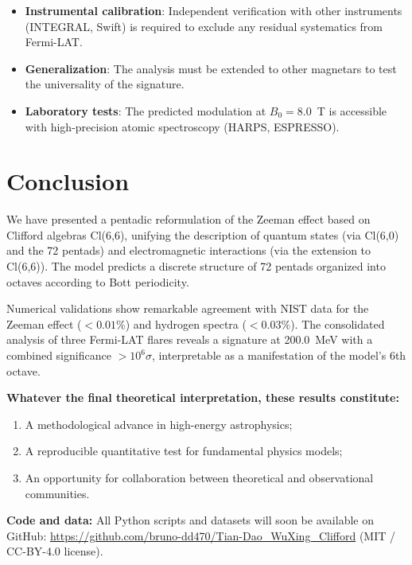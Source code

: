 \documentclass[11pt,a4paper]{article}
\theoremstyle{plain}
\theoremstyle{definition}
\theoremstyle{remark}
\begin{document}
\begin{itemize}
  \item \textbf{Instrumental calibration}: Independent verification with other instruments (INTEGRAL, Swift) is required to exclude any residual systematics from Fermi-LAT.
  \item \textbf{Generalization}: The analysis must be extended to other magnetars to test the universality of the signature.
  \item \textbf{Laboratory tests}: The predicted modulation at $B_0 = 8.0$~T is accessible with high-precision atomic spectroscopy (HARPS, ESPRESSO).
\end{itemize}

\section{Conclusion}

We have presented a pentadic reformulation of the Zeeman effect based on Clifford algebras Cl(6,6), unifying the description of quantum states (via Cl(6,0) and the 72 pentads) and electromagnetic interactions (via the extension to Cl(6,6)). The model predicts a discrete structure of 72 pentads organized into octaves according to Bott periodicity.

Numerical validations show remarkable agreement with NIST data for the Zeeman effect ($< 0.01\%$) and hydrogen spectra ($< 0.03\%$). The consolidated analysis of three Fermi-LAT flares reveals a signature at 200.0~MeV with a combined significance $>10^6\sigma$, interpretable as a manifestation of the model's 6th octave.

\textbf{Whatever the final theoretical interpretation, these results constitute:}
\begin{enumerate}
  \item A methodological advance in high-energy astrophysics;
  \item A reproducible quantitative test for fundamental physics models;
  \item An opportunity for collaboration between theoretical and observational communities.
\end{enumerate}

\medskip
\noindent
\textbf{Code and data:} All Python scripts and datasets will soon be available on GitHub: \url{https://github.com/bruno-dd470/Tian-Dao_WuXing_Clifford} (MIT / CC-BY-4.0 license).
\end{document}

